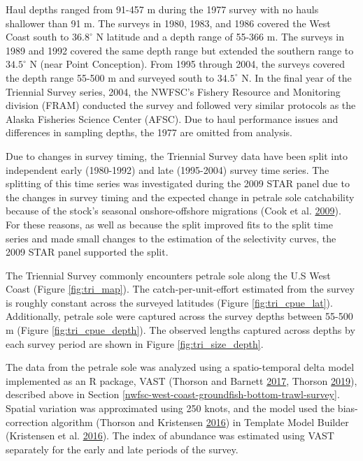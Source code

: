 \documentclass[12pt,]{article}
\begin{document}
Haul depths ranged from 91-457 m during the 1977 survey with no hauls
shallower than 91 m. The surveys in 1980, 1983, and 1986 covered the
West Coast south to \(36.8^\circ\) N latitude and a depth range of
55-366 m. The surveys in 1989 and 1992 covered the same depth range but
extended the southern range to \(34.5^\circ\) N (near Point Conception).
From 1995 through 2004, the surveys covered the depth range 55-500 m and
surveyed south to \(34.5^\circ\) N. In the final year of the Triennial
Survey series, 2004, the NWFSC's Fishery Resource and Monitoring
division (FRAM) conducted the survey and followed very similar protocols
as the Alaska Fisheries Science Center (AFSC). Due to haul performance
issues and differences in sampling depths, the 1977 are omitted from
analysis.

Due to changes in survey timing, the Triennial Survey data have been
split into independent early (1980-1992) and late (1995-2004) survey
time series. The splitting of this time series was investigated during
the 2009 STAR panel due to the changes in survey timing and the expected
change in petrale sole catchability because of the stock's seasonal
onshore-offshore migrations (Cook et al.
\protect\hyperlink{ref-cook_petrale_2009}{2009}). For these reasons, as
well as because the split improved fits to the split time series and
made small changes to the estimation of the selectivity curves, the 2009
STAR panel supported the split.

The Triennial Survey commonly encounters petrale sole along the U.S West
Coast (Figure \ref{fig:tri_map}). The catch-per-unit-effort estimated
from the survey is roughly constant across the surveyed latitudes
(Figure \ref{fig:tri_cpue_lat}). Additionally, petrale sole were
captured across the survey depths between 55-500 m (Figure
\ref{fig:tri_cpue_depth}). The observed lengths captured across depths
by each survey period are shown in Figure \ref{fig:tri_size_depth}.

The data from the petrale sole was analyzed using a spatio-temporal
delta model implemented as an R package, VAST (Thorson and Barnett
\protect\hyperlink{ref-thorson_comparing_2017}{2017}, Thorson
\protect\hyperlink{ref-thorson_guidance_2019}{2019}), described above in
Section \ref{nwfsc-west-coast-groundfish-bottom-trawl-survey}. Spatial
variation was approximated using 250 knots, and the model used the
bias-correction algorithm (Thorson and Kristensen
\protect\hyperlink{ref-thorson_implementing_2016}{2016}) in Template
Model Builder (Kristensen et al.
\protect\hyperlink{ref-kristensen_tmb:_2016}{2016}). The index of
abundance was estimated using VAST separately for the early and late
periods of the survey.
\end{document}
